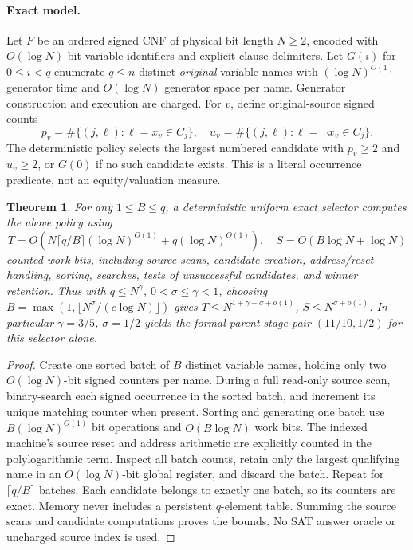\documentclass[11pt]{article}
\newtheorem{theorem}{Theorem}
\begin{document}
\paragraph{Exact model.}
Let $F$ be an ordered signed CNF of physical bit length $N\ge2$, encoded with $O(\log N)$-bit variable identifiers and explicit clause delimiters. Let $G(i)$ for $0\le i<q$ enumerate $q\le n$ distinct \emph{original} variable names with $(\log N)^{O(1)}$ generator time and $O(\log N)$ generator space per name. Generator construction and execution are charged. For $v$, define original-source signed counts
\[
p_v=\#\{(j,\ell):\ell=x_v\in C_j\},\quad
u_v=\#\{(j,\ell):\ell=\neg x_v\in C_j\}.
\]
The deterministic policy selects the largest numbered candidate with $p_v\ge2$ and $u_v\ge2$, or $G(0)$ if no such candidate exists. This is a literal occurrence predicate, not an equity/valuation measure.

\begin{theorem}
For any $1\le B\le q$, a deterministic uniform exact selector computes the above policy using
\[
T=O\left(N\lceil q/B\rceil(\log N)^{O(1)}+q(\log N)^{O(1)}\right),
\quad S=O(B\log N+\log N)
\]
counted work bits, including source scans, candidate creation, address/reset handling, sorting, searches, tests of unsuccessful candidates, and winner retention. Thus with $q\le N^\gamma$, $0<\sigma\le\gamma<1$, choosing $B=\max(1,\lfloor N^\sigma/(c\log N)\rfloor)$ gives $T\le N^{1+\gamma-\sigma+o(1)}$, $S\le N^{\sigma+o(1)}$. In particular $\gamma=3/5$, $\sigma=1/2$ yields the formal parent-stage pair $(11/10,1/2)$ for this selector alone.
\end{theorem}
\begin{proof}
Create one sorted batch of $B$ distinct variable names, holding only two $O(\log N)$-bit signed counters per name. During a full read-only source scan, binary-search each signed occurrence in the sorted batch, and increment its unique matching counter when present. Sorting and generating one batch use $B(\log N)^{O(1)}$ bit operations and $O(B\log N)$ work bits. The indexed machine's source reset and address arithmetic are explicitly counted in the polylogarithmic term. Inspect all batch counts, retain only the largest qualifying name in an $O(\log N)$-bit global register, and discard the batch. Repeat for $\lceil q/B\rceil$ batches. Each candidate belongs to exactly one batch, so its counters are exact. Memory never includes a persistent $q$-element table. Summing the source scans and candidate computations proves the bounds. No SAT answer oracle or uncharged source index is used.
\end{proof}
\end{document}
